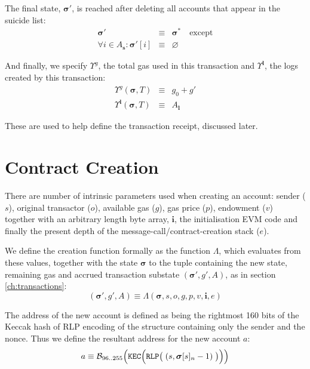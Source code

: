 \documentclass[9pt,oneside]{amsart}
\begin{document}
\begin{multicols}{2}
The final state, $\boldsymbol{\sigma}'$, is reached after deleting all accounts that appear in the suicide list:
\begin{eqnarray}
\boldsymbol{\sigma}' & \equiv & \boldsymbol{\sigma}^* \quad \text{except} \\
\forall i \in A_\mathbf{s}: \boldsymbol{\sigma}'[i] & \equiv & \varnothing
\end{eqnarray}

And finally, we specify $\Upsilon^g$, the total gas used in this transaction and $\Upsilon^\mathbf{l}$, the logs created by this transaction:
\begin{eqnarray}
\Upsilon^g(\boldsymbol{\sigma}, T) & \equiv & g_0 + g' \\
\Upsilon^\mathbf{l}(\boldsymbol{\sigma}, T) & \equiv & A_\mathbf{l}
\end{eqnarray}

These are used to help define the transaction receipt, discussed later.


\section{Contract Creation} \label{ch:create}

There are number of intrinsic parameters used when creating an account: sender ($s$), original transactor ($o$), available gas ($g$), gas price ($p$), endowment ($v$) together with an arbitrary length byte array, $\mathbf{i}$, the initialisation EVM code and finally the present depth of the message-call/contract-creation stack ($e$).

We define the creation function formally as the function $\Lambda$, which evaluates from these values, together with the state $\boldsymbol{\sigma}$ to the tuple containing the new state, remaining gas and accrued transaction substate $(\boldsymbol{\sigma}', g', A)$, as in section \ref{ch:transactions}:
\begin{equation}
(\boldsymbol{\sigma}', g', A) \equiv \Lambda(\boldsymbol{\sigma}, s, o, g, p, v, \mathbf{i}, e)
\end{equation}

The address of the new account is defined as being the rightmost 160 bits of the Keccak hash of RLP encoding of the structure containing only the sender and the nonce. Thus we define the resultant address for the new account $a$:
\begin{equation}
a \equiv \mathcal{B}_{96..255}\Big(\mathtt{\tiny KEC}\Big(\mathtt{\tiny RLP}\big(\;(s, \boldsymbol{\sigma}[s]_n - 1)\;\big)\Big)\Big)
\end{equation}


\end{multicols}
\end{document}
